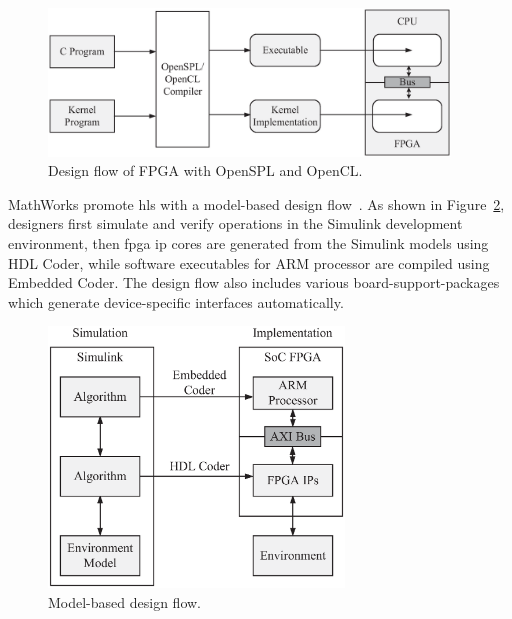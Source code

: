 \begin{figure}[ht]
\begin{center}
\includegraphics[width=0.95\textwidth]{2_background/figures/openspl}
\end{center}
\caption{Design flow of FPGA with OpenSPL and OpenCL.}
\label{fig:openspl}
\end{figure}

MathWorks promote \gls{hls} with a model-based design flow~\cite{mathworks,sharma09}.
As shown in Figure~\ref{fig:hdlcoder}, designers first simulate and verify operations in the Simulink development environment, then \gls{fpga} \gls{ip} cores are generated from the Simulink models using HDL Coder, while software executables for ARM processor are compiled using Embedded Coder.
The design flow also includes various board-support-packages which generate device-specific interfaces automatically.

\begin{figure}[ht]
\begin{center}
\includegraphics[width=0.7\textwidth]{2_background/figures/hdlcoder}
\end{center}
\caption{Model-based design flow.}
\label{fig:hdlcoder}
\end{figure}

